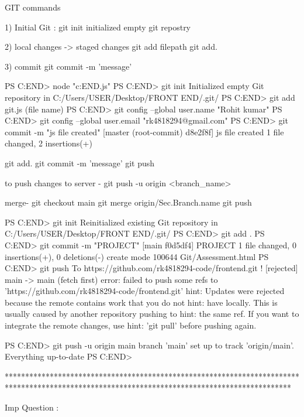 GIT commands

1) Initial Git :  
git init
initialized  empty git repostry

2) local changes -> staged changes
git add filepath
git add.

3) commit
 git commit -m 'message'


PS C:\Users\USER\Desktop\FRONT END> node "c:\Users\USER\Desktop\FRONT END\git.js"
PS C:\Users\USER\Desktop\FRONT END> git init
Initialized empty Git repository in C:/Users/USER/Desktop/FRONT END/.git/
PS C:\Users\USER\Desktop\FRONT END> git add git.js (file name)
PS C:\Users\USER\Desktop\FRONT END> git config --global user.name "Rohit kumar"
PS C:\Users\USER\Desktop\FRONT END> git config --global user.email "rk4818294@gmail.com"
PS C:\Users\USER\Desktop\FRONT END> git commit -m "js file created"
[master (root-commit) d8e2f8f] js file created
 1 file changed, 2 insertions(+)


git add.
 git commit -m 'message'
 git push



 to push changes to server - git push -u origin <branch_name>

merge-
git checkout main
git merge origin/Sec.Branch.name
git push


PS C:\Users\USER\Desktop\FRONT END> git init
Reinitialized existing Git repository in C:/Users/USER/Desktop/FRONT END/.git/
PS C:\Users\USER\Desktop\FRONT END> git add .
PS C:\Users\USER\Desktop\FRONT END> git commit -m "PROJECT"
[main f0d5df4] PROJECT
 1 file changed, 0 insertions(+), 0 deletions(-)
 create mode 100644 Git/Assessment.html
PS C:\Users\USER\Desktop\FRONT END> git push
To https://github.com/rk4818294-code/frontend.git
 ! [rejected]        main -> main (fetch first)
error: failed to push some refs to 'https://github.com/rk4818294-code/frontend.git'
hint: Updates were rejected because the remote contains work that you do not
hint: have locally. This is usually caused by another repository pushing to
hint: the same ref. If you want to integrate the remote changes, use
hint: 'git pull' before pushing again.

PS C:\Users\USER\Desktop\FRONT END> git push -u origin main
branch 'main' set up to track 'origin/main'.
Everything up-to-date
PS C:\Users\USER\Desktop\FRONT END> 


**********************************************************************************************************************************************


Imp Question :

